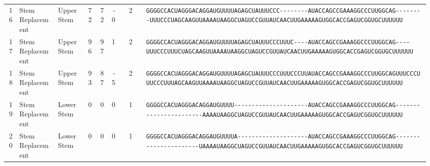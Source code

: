 \begin{tabular}{rllrrrrrcl}
 16 & Stem Replacement & Upper Stem & 72 & 72 & -0 &  & 2 &  &
 \color{ucsfdarkgrey}\verb|GGGGCCACUAGGGACAGGAU|\color{ucsforange}\verb|GUUUUA|\color{ucsfblue}\verb|GAGCUAUUUCCC--------|\color{ucsfpurple}\verb|AUACCAGCCGAAAGGCCCUUGGCAG|\color{ucsfblue}\verb|--------UUUCCCUAGCAAGU|\color{ucsforange}\verb|UAAAAUAA|\color{ucsfnavy}\verb|GGCUAGUCC|\color{ucsforange}\verb|GUUAUCA|\color{ucsfteal}\verb|ACUUGAAAAAGU|\color{ucsforange}\verb|GGCACCGAGUCGGUGCUUUUUU| \\

 17 & Stem Replacement & Upper Stem & 96 & 97 & 1 &  & 2 &  &
 \color{ucsfdarkgrey}\verb|GGGGCCACUAGGGACAGGAU|\color{ucsforange}\verb|GUUUUA|\color{ucsfblue}\verb|GAGCUAUUUCCCUUUC----|\color{ucsfpurple}\verb|AUACCAGCCGAAAGGCCCUUGGCAG|\color{ucsfblue}\verb|----UUUCCCUUUCUAGCAAGU|\color{ucsforange}\verb|UAAAAUAA|\color{ucsfnavy}\verb|GGCUAGUCC|\color{ucsforange}\verb|GUUAUCA|\color{ucsfteal}\verb|ACUUGAAAAAGU|\color{ucsforange}\verb|GGCACCGAGUCGGUGCUUUUUU| \\

 18 & Stem Replacement & Upper Stem & 93 & 87 & -5 &  & 2 &  &
 \color{ucsfdarkgrey}\verb|GGGGCCACUAGGGACAGGAU|\color{ucsforange}\verb|GUUUUA|\color{ucsfblue}\verb|GAGCUAUUUCCCUUUCCCUU|\color{ucsfpurple}\verb|AUACCAGCCGAAAGGCCCUUGGCAG|\color{ucsfblue}\verb|UUUCCCUUUCCCUUUAGCAAGU|\color{ucsforange}\verb|UAAAAUAA|\color{ucsfnavy}\verb|GGCUAGUCC|\color{ucsforange}\verb|GUUAUCA|\color{ucsfteal}\verb|ACUUGAAAAAGU|\color{ucsforange}\verb|GGCACCGAGUCGGUGCUUUUUU| \\

 19 & Stem Replacement & Lower Stem & 0 & 0 & 0 &  & 1 &  &
 \color{ucsfdarkgrey}\verb|GGGGCCACUAGGGACAGGAU|\color{ucsforange}\verb|GUUUU-|\color{ucsfblue}\verb|--------------------|\color{ucsfpurple}\verb|AUACCAGCCGAAAGGCCCUUGGCAG|\color{ucsfblue}\verb|----------------------|\color{ucsforange}\verb|-AAAAUAA|\color{ucsfnavy}\verb|GGCUAGUCC|\color{ucsforange}\verb|GUUAUCA|\color{ucsfteal}\verb|ACUUGAAAAAGU|\color{ucsforange}\verb|GGCACCGAGUCGGUGCUUUUUU| \\

 20 & Stem Replacement & Lower Stem & 0 & 0 & 0 &  & 1 &  &
 \color{ucsfdarkgrey}\verb|GGGGCCACUAGGGACAGGAU|\color{ucsforange}\verb|GUUUUA|\color{ucsfblue}\verb|--------------------|\color{ucsfpurple}\verb|AUACCAGCCGAAAGGCCCUUGGCAG|\color{ucsfblue}\verb|----------------------|\color{ucsforange}\verb|UAAAAUAA|\color{ucsfnavy}\verb|GGCUAGUCC|\color{ucsforange}\verb|GUUAUCA|\color{ucsfteal}\verb|ACUUGAAAAAGU|\color{ucsforange}\verb|GGCACCGAGUCGGUGCUUUUUU| \\


\end{tabular}
